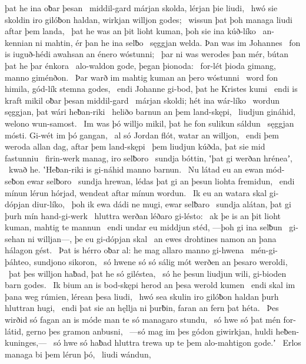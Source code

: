 þat he ina oƀar þesan \hld\ middil-gard márjan skolda,
lérjan þie liudi, \hld\ hwó sie skoldin iro gilóƀon haldan,
wirkjan willjon godes; \hld\ wissun þat þoh managa
liudi aftar þem landa, \hld\ þat he was an þit lioht kuman,
þoh sie ina kúð-líko \hld\ an-kennian ni mahtin,
ér þan he ina selƀo \hld\ sęggjan welda.
Þan was im Johannes \hld\ fon is iuguð-hédi
awahsan an énero wóstunni; \hld\ þar ni was werodes þan mér,
bútan þat he þar énkora \hld\ alo-waldon gode,
þegan þionoda: \hld\ for-lét þioda gimang,
manno giménðon. \hld\ Þar warð im mahtig kuman
an þero wóstunni \hld\ word fon himila,
gód-lík stemna godes, \hld\ endi Johanne gi-bod,
þat he Kristes kumi \hld\ endi is kraft mikil
oƀar þesan middil-gard \hld\ márjan skoldi;
hét ina wár-líko \hld\ wordun sęggjan,
þat wári heƀan-riki \hld\ heliðo barnun
an þem land-skępi, \hld\ liudjun gináhid,
welono wun-samost. \hld\ Im was þó willjo mikil,
þat he fon sulikun sáldun \hld\ sęggjan mósti.
Gi-wét im þó gangan, \hld\ al só Jordan flót,
watar an willjon, \hld\ endi þem weroda allan dag,
aftar þem land-skępi \hld\ þem liudjun kúðda,
þat sie mid fastunniu \hld\ firin-werk manag,
iro selƀoro \hld\ sundja bóttin,
ʽþat gi werðan hréneaʼ, \hld\ kwað he. ʽHeƀan-riki is
gi-náhid manno barnun. \hld\ Nu látad eu an ewan mód-seƀon
ewar selƀoro \hld\ sundja hrewan,
lédas þat gi an þesun liohta fremidun, \hld\ endi mínun lérun hórjad,
wendeat aftar mínun wordun. \hld\ Ik eu an watara skal
gi-dópjan diur-líko, \hld\ þoh ik ewa dádi ne mugi,
ewar selƀaro \hld\ sundja alátan,
þat gi þurh mín hand-gi-werk \hld\ hluttra werðan
léðaro gi-lésto: \hld\ ak þe is an þit lioht kuman,
mahtig te mannun \hld\ endi undar eu middjun stéd,
—þoh gi ina selƀun \hld\ gi-sehan ni willjan—,
þe eu gi-dópjan skal \hld\ an ewes drohtines namon
an þana hálagon gést. \hld\ Þat is hérro oƀar al:
he mag allaro manno gi-hwena \hld\ mén-gi-þáhteo,
sundjono sikoron, \hld\ só hwene só só sálig mót
werðen an þesaro weroldi, \hld\ þat þes willjon haƀad,
þat he só giléstea, \hld\ só he þesun liudjun wili,
gi-bioden barn godes. \hld\ Ik bium an is bod-skępi herod
an þesa werold kumen \hld\ endi skal im þana weg rúmien,
lérean þesa liudi, \hld\ hwó sea skulin iro gilóƀon haldan
þurh hluttran hugi, \hld\ endi þat sie an hęllja ni þurƀin,
faran an fern þat héta. \hld\ Þes wirðid só fagan an is móde
man te só managaro stundu, \hld\ só hwe só þat mén for-látid,
gerno þes gramon anbusni, \hld\ —só mag im þes gódon giwirkjan,
huldi heƀen-kuninges,— \hld\ só hwe só haƀad hluttra trewa
up te þem alo-mahtigon gode.ʼ \hld\ Erlos managa
bi þem lérun þó, \hld\ liudi wándun,
